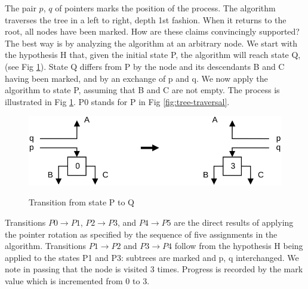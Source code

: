 The pair $p$, $q$ of pointers marks the position of the process. The algorithm traverses
the tree in a left to right, depth 1st fashion. When it returns to the root, all nodes
have been marked. How are these claims convincingly supported? The best way is by analyzing
the algorithm at an arbitrary node. We start with the hypothesis H that, given the initial
state P, the algorithm will reach state Q, (see Fig \ref{fig:transition}). State Q differs
from P by the node and its descendants B and C having been marked, and by an exchange of p
and q. We now apply the algorithm to state P, assuming that B and C are not empty. The process
is illustrated in Fig \ref{fig:transition}. P0 stands for P in Fig \ref{fig:tree-traversal}.
\begin{figure}[h!]
  \centering
  \includegraphics[width=\textwidth]{i/u}
  \label{fig:transition}
  \caption{Transition from state P to Q}
\end{figure}
Transitions $P0 \rightarrow P1$, $P2 \rightarrow P3$, and $P4 \rightarrow P5$ are the direct
results of applying the pointer rotation as specified by the sequence of five assignments
in the algorithm. Transitions $P1 \rightarrow P2$ and $P3 \rightarrow P4$ follow from the
hypothesis H being applied to the states P1 and P3: subtrees are marked and p, q interchanged.
We note in passing that the node is visited 3 times. Progress is recorded by the mark value
which is incremented from 0 to 3.

